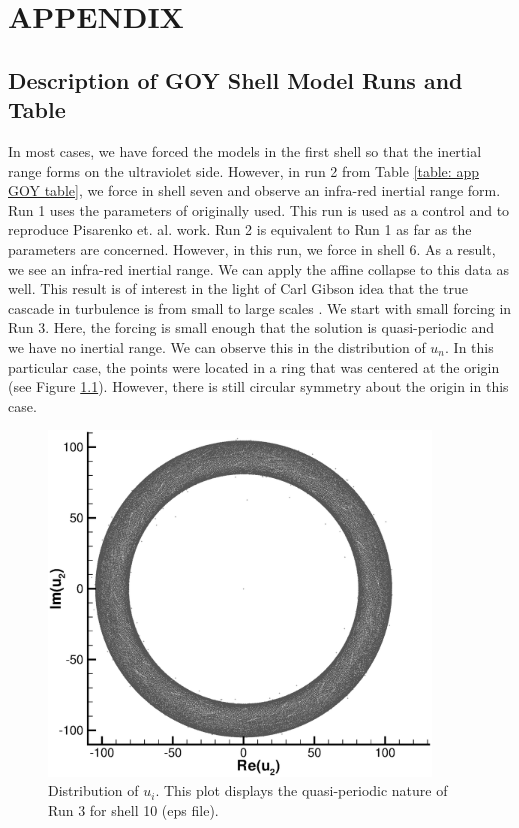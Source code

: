 
\chapter{APPENDIX} \label{ch:table appendix}

\vspace{-0.2in}

\section{Description of GOY Shell Model Runs and Table}

In most cases, we have forced the models in the first shell so that the inertial range forms on the ultraviolet side.  However, in run 2 from Table \ref{table: app GOY table}, we force in shell seven and observe an infra-red inertial range form.  Run 1 uses the parameters of \cite{Yamada} originally used.  This run is used as a control and to reproduce Pisarenko et. al. \cite{Pisarenko} work.  Run 2 is equivalent to Run 1 as far as the parameters are concerned.  However, in this run, we force in shell 6.  As a result, we see an infra-red inertial range.  We can apply the affine collapse to this data as well. This result is of interest in the light of Carl Gibson idea that the true cascade in turbulence is from small to large scales \cite{Gibson}. We start with small forcing in Run 3.  Here, the forcing is small enough that the solution is quasi-periodic and we have no inertial range.  We can observe this in the distribution of $u_n$.  In this particular case, the points were located in a ring that was centered at the origin (see Figure \ref{fig: circ symtrc}).   However, there is still circular symmetry about the origin in this case.

\begin{figure}[!htp]
    \begin{center}
        \includegraphics[width=4in]{ns_run10urui.eps}
    \end{center}
    \caption{Distribution of $u_i$. This plot displays the quasi-periodic nature of Run 3 for shell 10 (eps file).} \label{fig: circ symtrc}
\end{figure}

